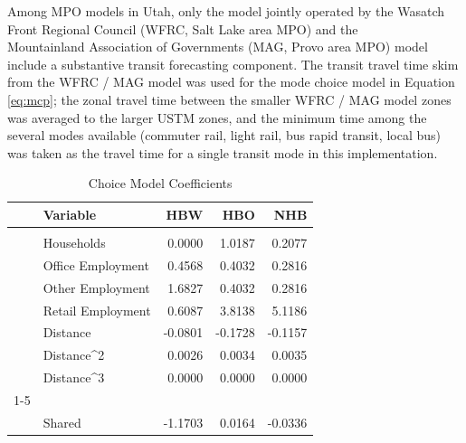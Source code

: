 \documentclass[3p, authoryear]{elsarticle} %
\begin{document}
Among MPO models in Utah, only the model jointly operated by the
Wasatch Front Regional Council (WFRC, Salt Lake area MPO) and the\\
Mountainland Association of Governments (MAG, Provo area MPO) model include a
substantive transit forecasting component. The transit travel time skim from the
WFRC / MAG model was used for the mode choice model in Equation \eqref{eq:mcp};
the zonal travel time between the smaller WFRC / MAG model zones was averaged
to the larger USTM zones, and the minimum time among the several modes available
(commuter rail, light rail, bus rapid transit, local bus) was taken as the travel
time for a single transit mode in this implementation.

\begin{table}

\caption{\label{tab:coeffs}Choice Model Coefficients}
\centering
\begin{tabular}[t]{llrrr}
\toprule
 & Variable & HBW & HBO & NHB\\
\midrule
\addlinespace[0.3em]
\multicolumn{5}{l}{\textbf{Destination Choice}}\\
\hspace{1em} & Households & 0.0000 & 1.0187 & 0.2077\\

\hspace{1em} & Office Employment & 0.4568 & 0.4032 & 0.2816\\

\hspace{1em} & Other Employment & 1.6827 & 0.4032 & 0.2816\\

\hspace{1em} & Retail Employment & 0.6087 & 3.8138 & 5.1186\\

\hspace{1em} & Distance & -0.0801 & -0.1728 & -0.1157\\

\hspace{1em} & Distance\textasciicircum{}2 & 0.0026 & 0.0034 & 0.0035\\

\hspace{1em} & Distance\textasciicircum{}3 & 0.0000 & 0.0000 & 0.0000\\
\cmidrule{1-5}
\addlinespace[0.3em]
\multicolumn{5}{l}{\textbf{Mode Choice}}\\
\hspace{1em} & Shared & -1.1703 & 0.0164 & -0.0336\\


\end{tabular}
\end{table}
\end{document}
